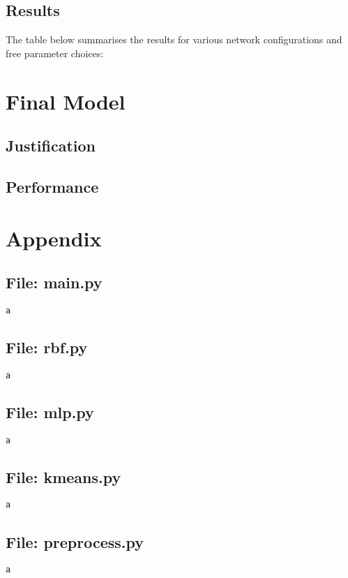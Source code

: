 \documentclass{article}
\begin{document}
\subsection*{Results}
\noindent The table below summarises the results for various network configurations and free parameter choices:

\section*{Final Model}
\subsection*{Justification}
\subsection*{Performance}

\section*{Appendix}
\subsection*{File: main.py}
\begin{verbatim}
a
\end{verbatim}

\subsection*{File: rbf.py}
\begin{verbatim}
a
\end{verbatim}

\subsection*{File: mlp.py}
\begin{verbatim}
a
\end{verbatim}

\subsection*{File: kmeans.py}
\begin{verbatim}
a
\end{verbatim}

\subsection*{File: preprocess.py}
\begin{verbatim}
a
\end{verbatim}
\end{document}
